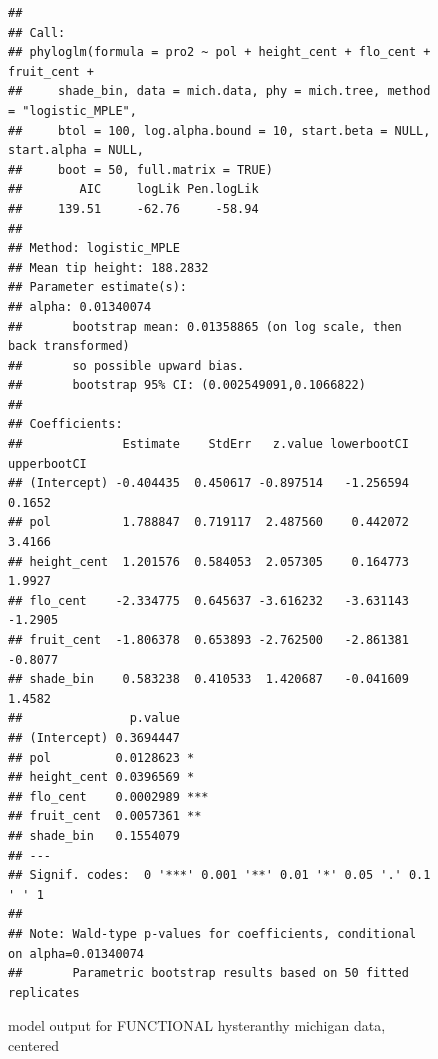 \documentclass{article}\usepackage[]{graphicx}\usepackage[]{color}
\makeatletter
\newenvironment{kframe}{%
 \def\at@end@of@kframe{}%
 \ifinner\ifhmode%
  \def\at@end@of@kframe{\end{minipage}}%
  \begin{minipage}{\columnwidth}%
 \fi\fi%
 \def\FrameCommand##1{\hskip\@totalleftmargin \hskip-\fboxsep
 \colorbox{shadecolor}{##1}\hskip-\fboxsep
     \hskip-\linewidth \hskip-\@totalleftmargin \hskip\columnwidth}%
 \MakeFramed {\advance\hsize-\width
   \@totalleftmargin\z@ \linewidth\hsize
   \@setminipage}}%
 {\par\unskip\endMakeFramed%
 \at@end@of@kframe}
\newenvironment{knitrout}{}{} %
\makeatother
\begin{document}
\begin{figure}[h!]
\begin{knitrout}
\color{fgcolor}\begin{kframe}
\begin{verbatim}
## 
## Call:
## phyloglm(formula = pro2 ~ pol + height_cent + flo_cent + fruit_cent + 
##     shade_bin, data = mich.data, phy = mich.tree, method = "logistic_MPLE", 
##     btol = 100, log.alpha.bound = 10, start.beta = NULL, start.alpha = NULL, 
##     boot = 50, full.matrix = TRUE)
##        AIC     logLik Pen.logLik 
##     139.51     -62.76     -58.94 
## 
## Method: logistic_MPLE
## Mean tip height: 188.2832
## Parameter estimate(s):
## alpha: 0.01340074 
##       bootstrap mean: 0.01358865 (on log scale, then back transformed)
##       so possible upward bias.
##       bootstrap 95% CI: (0.002549091,0.1066822)
## 
## Coefficients:
##              Estimate    StdErr   z.value lowerbootCI upperbootCI
## (Intercept) -0.404435  0.450617 -0.897514   -1.256594      0.1652
## pol          1.788847  0.719117  2.487560    0.442072      3.4166
## height_cent  1.201576  0.584053  2.057305    0.164773      1.9927
## flo_cent    -2.334775  0.645637 -3.616232   -3.631143     -1.2905
## fruit_cent  -1.806378  0.653893 -2.762500   -2.861381     -0.8077
## shade_bin    0.583238  0.410533  1.420687   -0.041609      1.4582
##               p.value    
## (Intercept) 0.3694447    
## pol         0.0128623 *  
## height_cent 0.0396569 *  
## flo_cent    0.0002989 ***
## fruit_cent  0.0057361 ** 
## shade_bin   0.1554079    
## ---
## Signif. codes:  0 '***' 0.001 '**' 0.01 '*' 0.05 '.' 0.1 ' ' 1
## 
## Note: Wald-type p-values for coefficients, conditional on alpha=0.01340074
##       Parametric bootstrap results based on 50 fitted replicates
\end{verbatim}
\end{kframe}
\end{knitrout}
\caption{model output for FUNCTIONAL hysteranthy michigan data, centered}
\end{figure}
\end{document}
